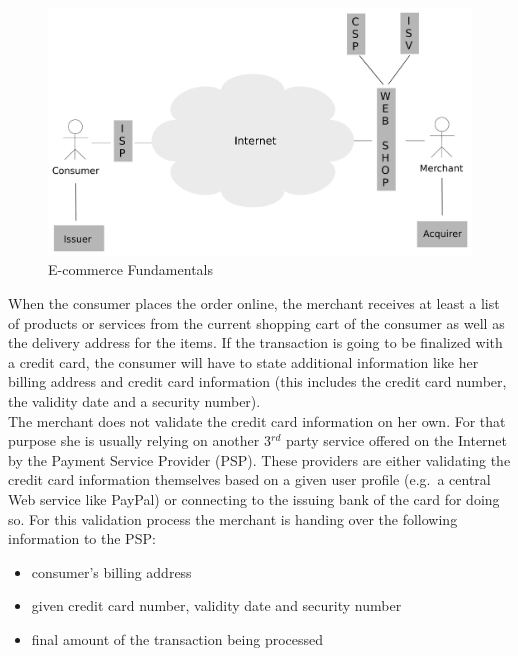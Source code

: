 \begin{figure}[H]
	\centering
		\includegraphics[width=0.8\columnwidth]{images/e-commerce-scenario.pdf}
	\caption{E-commerce Fundamentals}
\label{fig:images_ecommerce_scenario}
\end{figure}

When the consumer places the order online, the merchant receives at least a list of products or services from the current shopping cart of the consumer as well as the delivery address for the items. If the transaction is going to be finalized with a credit card, the consumer will have to state additional information like her billing address and credit card information (this includes the credit card number, the validity date and a security number). \\
The merchant does not validate the credit card information on her own. For that purpose she is usually relying on another 3$^{rd}$ party service offered on the Internet by the Payment Service Provider (PSP). These providers are either validating the credit card information themselves based on a given user profile (e.g.\ a central Web service like PayPal) or connecting to the issuing bank of the card for doing so. For this validation process the merchant is handing over the following information to the PSP:\@

\begin{itemize}
    \item consumer's billing address
    \item given credit card number, validity date and security number
    \item final amount of the transaction being processed
\end{itemize}

